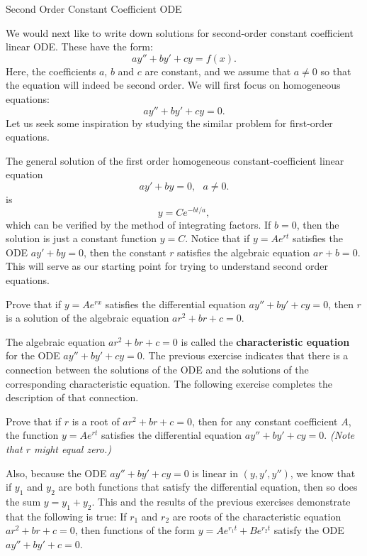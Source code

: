 \documentclass[12pt,letterpaper,twoside]{amsart}
\newcounter{example}
\newcounter{exercise}
\newcounter{problem}
\newcommand{\exercise}{\bigskip \noindent {\large {\sc Exercise \arabic{exercise}:}} \addtocounter{exercise}{1}}
\begin{document}
\sffamily

\begin{center} {\LARGE Second Order Constant Coefficient ODE} \end{center}

\setcounter{example}{1}
\setcounter{exercise}{1}

We would next like to write down solutions for second-order constant coefficient linear ODE.  These have the form:
\[ a y''+by'+cy=f(x).\]
Here, the coefficients $a$, $b$ and $c$ are constant, and we assume that $a\neq 0$ so that the equation will indeed be second order.  We will first focus on homogeneous equations:
\[ ay''+by'+cy=0.\]
Let us seek some inspiration by studying the similar problem for first-order equations.

The general solution of the first order homogeneous constant-coefficient linear equation
\[ ay'+by=0, \ \ \ a \neq 0.\]
is
\[ y = Ce^{-bt/a},\]
which can be verified by the method of integrating factors.  If $b=0$, then the solution is just a constant function $y=C$.  Notice that if $y=Ae^{rt}$ satisfies the ODE $ay'+by=0$, then the constant $r$ satisfies the algebraic equation $ar+b=0$.  This will serve as our starting point for trying to understand second order equations.

\exercise Prove that if $y=Ae^{rx}$ satisfies the differential equation $ay''+by'+cy=0$, then $r$ is a solution of the algebraic equation $ar^2+br+c=0$.  

\medskip
The algebraic equation $ar^2+br+c=0$ is called the {\bf characteristic equation} for the ODE $ay''+by'+cy=0$.  The previous exercise indicates that there is a connection between the solutions of the ODE and the solutions of the corresponding characteristic equation.  The following exercise completes the description of that connection.

\exercise Prove that if $r$ is a root of $ar^2+br+c=0$, then for any constant coefficient $A$, the function $y=Ae^{rt}$ satisfies the differential equation $ay''+by'+cy=0$. {\it (Note that $r$ might equal zero.)}

\medskip
Also, because the ODE $ay''+by'+cy=0$ is linear in $(y,y',y'')$, we know that if $y_1$ and $y_2$ are both functions that satisfy the differential equation, then so does the sum $y=y_1+y_2$.  This and the results of the previous exercises demonstrate that the following is true:  If $r_1$ and $r_2$ are roots of the characteristic equation $ar^2+br+c=0$, then functions of the form $y=Ae^{r_1t}+Be^{r_2t}$ satisfy the ODE $ay''+by'+c=0$.
\end{document}
